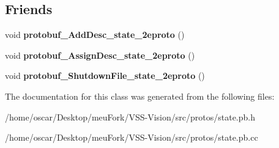 \subsection*{Friends}
\begin{DoxyCompactItemize}
\item 
\hypertarget{classvss__state_1_1RGB_aab1a2c258f8122a403a979ff57e2a706}{void {\bfseries protobuf\-\_\-\-Add\-Desc\-\_\-state\-\_\-2eproto} ()}\label{classvss__state_1_1RGB_aab1a2c258f8122a403a979ff57e2a706}

\item 
\hypertarget{classvss__state_1_1RGB_a57d9367bc8a7a94ead11d11194cca1b6}{void {\bfseries protobuf\-\_\-\-Assign\-Desc\-\_\-state\-\_\-2eproto} ()}\label{classvss__state_1_1RGB_a57d9367bc8a7a94ead11d11194cca1b6}

\item 
\hypertarget{classvss__state_1_1RGB_a4e6dc5e8e72799859c4e9556d090e57d}{void {\bfseries protobuf\-\_\-\-Shutdown\-File\-\_\-state\-\_\-2eproto} ()}\label{classvss__state_1_1RGB_a4e6dc5e8e72799859c4e9556d090e57d}

\end{DoxyCompactItemize}


The documentation for this class was generated from the following files\-:\begin{DoxyCompactItemize}
\item 
/home/oscar/\-Desktop/meu\-Fork/\-V\-S\-S-\/\-Vision/src/protos/state.\-pb.\-h\item 
/home/oscar/\-Desktop/meu\-Fork/\-V\-S\-S-\/\-Vision/src/protos/state.\-pb.\-cc\end{DoxyCompactItemize}
